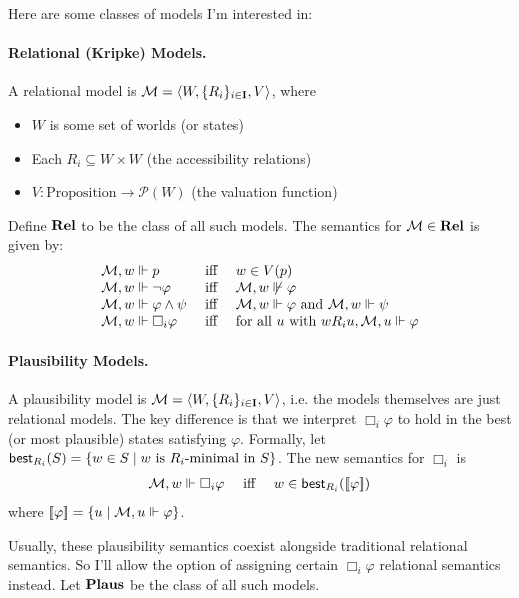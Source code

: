 \documentclass[letterpaper]{article}
\begin{document}
Here are some classes of models I'm interested in:

\paragraph*{Relational (Kripke) Models.} A relational model is $\mathcal{M} = \langle W, \{ R_i \}_{i \in \textbf{I}}, V \rangle$, where 
\begin{itemize}
    \item $W$ is some set of worlds (or states)
    \item Each $R_i \subseteq W \times W$ (the accessibility relations)
    \item $V : \textrm{Proposition} \to \mathcal{P}(W)$ (the valuation function)
\end{itemize}
Define $\textrm{\textbf{Rel}}$ to be the class of all such models.  The semantics for $\mathcal{M} \in \textrm{\textbf{Rel}}$ is given by:
\[
\begin{array}{lcl}
    \mathcal{M}, w \Vdash p & \mbox{ iff } & w \in V(p)\\
    \mathcal{M}, w \Vdash \neg \varphi & \mbox{ iff } & \mathcal{M}, w \not \Vdash \varphi\\
    \mathcal{M}, w \Vdash \varphi \land \psi & \mbox{ iff } & \mathcal{M}, w \Vdash \varphi \mbox{ and } \mathcal{M}, w \Vdash \psi\\
    \mathcal{M}, w \Vdash \Box_i \varphi & \mbox{ iff } & \mbox{for all } u \mbox{ with } w{R_i}u, \mathcal{M}, u \Vdash \varphi
\end{array}
\]

\paragraph*{Plausibility Models.}
A plausibility model is $\mathcal{M} = \langle W, \{ R_i \}_{i \in \textbf{I}}, V \rangle$, i.e. the models themselves are just relational models.  The key difference is that we interpret $\Box_i \varphi$ to hold in the best (or most plausible) states satisfying $\varphi$.  Formally, let $\mathsf{best}_{R_i}{(S)} = \{ w \in S \mid w \textrm{ is } R_i\textrm{-minimal in } S \}$.  The new semantics for $\Box_i$ is
\[
\begin{array}{lcl}
    \mathcal{M}, w \Vdash \Box_i \varphi & \mbox{ iff } & w \in \mathsf{best}_{R_i}{([\![\mbox{\em $ \varphi $\/}]\!])}
\end{array}
\]
where $[\![\mbox{\em $ \varphi $\/}]\!] = \{ u \mid \mathcal{M}, u \Vdash \varphi \}$.

Usually, these plausibility semantics coexist alongside traditional relational semantics.  So I'll allow the option of assigning certain $\Box_i \varphi$ relational semantics instead.  Let $\textrm{\textbf{Plaus}}$ be the class of all such models.
\end{document}
